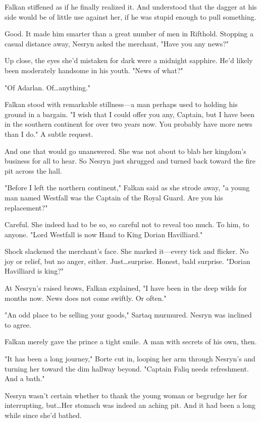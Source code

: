 Falkan stiffened as if he finally realized it.
And understood that the dagger at his side would be of little use against her, if he was stupid enough to pull something.

Good.
It made him smarter than a great number of men in Rifthold.
Stopping a casual distance away, Nesryn asked the merchant, "Have you any news?"

Up close, the eyes she'd mistaken for dark were a midnight sapphire.
He'd likely been moderately handsome in his youth.
"News of what?"

"Of Adarlan.
Of\ldots anything."

Falkan stood with remarkable stillness---a man perhaps used to holding his ground in a bargain.
"I wish that I could offer you any, Captain, but I have been in the southern continent for over two years now.
You probably have more news than I do."
A subtle request.

And one that would go unanswered.
She was not about to blab her kingdom's business for all to hear.
So Nesryn just shrugged and turned back toward the fire pit across the hall.

"Before I left the northern continent," Falkan said as she strode away, "a young man named Westfall was the Captain of the Royal Guard.
Are you his replacement?"

Careful.
She indeed had to be so, so careful not to reveal too much.
To him, to anyone.
"Lord Westfall is now Hand to King Dorian Havilliard."

Shock slackened the merchant's face.
She marked it---every tick and flicker.
No joy or relief, but no anger, either.
Just\ldots surprise.
Honest, bald surprise.
"Dorian Havilliard is king?"

At Nesryn's raised brows, Falkan explained, "I have been in the deep wilds for months now.
News does not come swiftly.
Or often."

"An odd place to be selling your goods," Sartaq murmured.
Nesryn was inclined to agree.

Falkan merely gave the prince a tight smile.
A man with secrets of his own, then.

"It has been a long journey," Borte cut in, looping her arm through Nesryn's and turning her toward the dim hallway beyond.
"Captain Faliq needs refreshment.
And a bath."

Nesryn wasn't certain whether to thank the young woman or begrudge her for interrupting, but\ldots Her stomach was indeed an aching pit.
And it had been a long while since she'd bathed.

